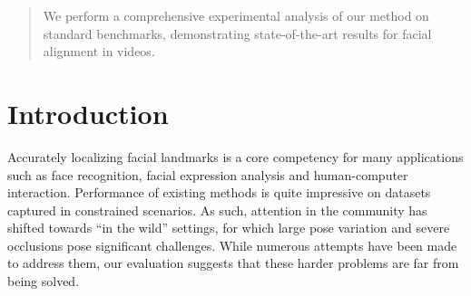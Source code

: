 \documentclass[letterpaper]{article} %
\begin{document}
\begin{abstract}
 We perform a comprehensive experimental analysis of our method on standard benchmarks, demonstrating state-of-the-art results for facial alignment in videos.
\end{abstract}

\section{Introduction}
\setcounter{secnumdepth}{2}

Accurately localizing facial landmarks is a core competency for many applications such as face recognition, facial expression analysis and human-computer interaction.
Performance of existing methods is quite impressive on datasets captured in constrained scenarios. As such, attention in the community has shifted towards ``in the wild'' \cite{Sagonas2016300FI} %
settings, for which large pose variation and severe occlusions pose significant challenges. While numerous attempts have been made to address them,
our evaluation suggests that these harder problems are far from being solved.
\end{document}
